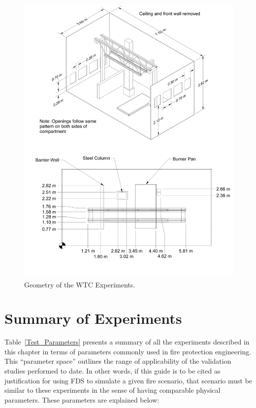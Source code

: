 \begin{figure}
\begin{center}
\includegraphics[height=6.in]{FIGURES/WTC/WTC}
\end{center}
\caption[Geometry of the WTC Experiments]{Geometry of the WTC Experiments.}
\label{WTC_Drawing}
\end{figure}

\clearpage







\section{Summary of Experiments}

\label{experiment_summary}

Table~\ref{Test_Parameters} presents a summary of all the experiments described in this chapter in terms of parameters commonly used in fire protection engineering. This ``parameter space'' outlines the range of applicability of the validation studies performed to date. In other words, if this guide is to be cited as justification for using FDS to simulate a given fire scenario, that scenario must be similar to these experiments in the sense of having comparable physical parameters. These parameters are explained below:

